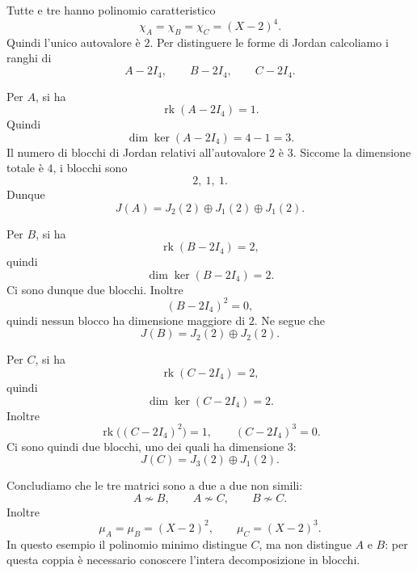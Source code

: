 \documentclass[a4paper]{article}
\begin{document}
\begin{radioactive}
\begin{snippetsolution}{}
    Tutte e tre hanno polinomio caratteristico
    \[
        \chi_A=\chi_B=\chi_C=(X-2)^4.
    \]
    Quindi l'unico autovalore è \(2\). Per distinguere le forme di Jordan calcoliamo i ranghi di
    \[
        A-2I_4,
        \qquad
        B-2I_4,
        \qquad
        C-2I_4.
    \]

    Per \(A\), si ha
    \[
        \operatorname{rk}(A-2I_4)=1.
    \]
    Quindi
    \[
        \dim\ker(A-2I_4)=4-1=3.
    \]
    Il numero di blocchi di Jordan relativi all'autovalore \(2\) è \(3\). Siccome la dimensione totale è \(4\), i blocchi sono
    \[
        2,\ 1,\ 1.
    \]
    Dunque
    \[
        J(A)=J_2(2)\oplus J_1(2)\oplus J_1(2).
    \]

    Per \(B\), si ha
    \[
        \operatorname{rk}(B-2I_4)=2,
    \]
    quindi
    \[
        \dim\ker(B-2I_4)=2.
    \]
    Ci sono dunque due blocchi. Inoltre
    \[
        (B-2I_4)^2=0,
    \]
    quindi nessun blocco ha dimensione maggiore di \(2\). Ne segue che
    \[
        J(B)=J_2(2)\oplus J_2(2).
    \]

    Per \(C\), si ha
    \[
        \operatorname{rk}(C-2I_4)=2,
    \]
    quindi
    \[
        \dim\ker(C-2I_4)=2.
    \]
    Inoltre
    \[
        \operatorname{rk}\big((C-2I_4)^2\big)=1,
        \qquad
        (C-2I_4)^3=0.
    \]
    Ci sono quindi due blocchi, uno dei quali ha dimensione \(3\):
    \[
        J(C)=J_3(2)\oplus J_1(2).
    \]

    Concludiamo che le tre matrici sono a due a due non simili:
    \[
        A\nsim B,
        \qquad
        A\nsim C,
        \qquad
        B\nsim C.
    \]
    Inoltre
    \[
        \mu_A=\mu_B=(X-2)^2,
        \qquad
        \mu_C=(X-2)^3.
    \]
    In questo esempio il polinomio minimo distingue \(C\), ma non
    distingue \(A\) e \(B\): per questa coppia è necessario conoscere
    l'intera decomposizione in blocchi.
\end{snippetsolution}
\end{radioactive}
\end{document}
